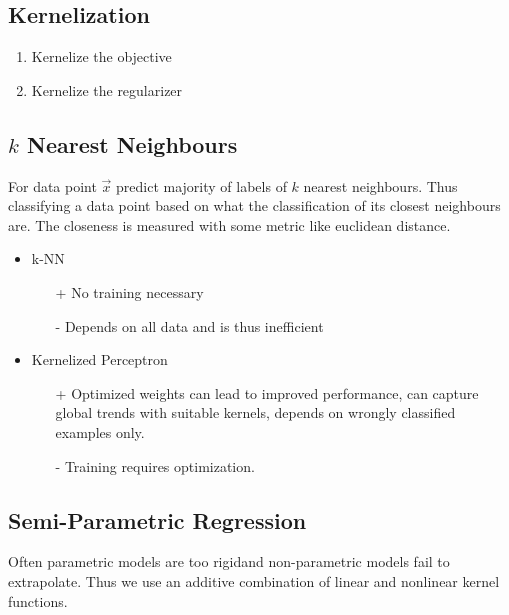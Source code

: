 \documentclass[8pt,a4paper]{scrartcl}
\begin{document}
\begin{multicols*}{3}
\subsection{Kernelization}


\begin{enumerate}
\ncompaq
\item Kernelize the objective
\item Kernelize the regularizer
\end{enumerate}

\subsection{$k$ Nearest Neighbours}

For data point $\vec{x}$ predict majority of labels of $k$ nearest neighbours. Thus classifying a data point based on what the classification of its closest neighbours are. The closeness is measured with some metric like euclidean distance.


\begin{itemize}
\ncompaq
\item k-NN
\begin{itemize}
\ncompaq
\item[+] No training necessary
\item[-] Depends on all data and is thus inefficient
\end{itemize}
\item Kernelized Perceptron
\begin{itemize}
\ncompaq
\item[+] Optimized weights can lead to improved performance, can capture global trends with suitable kernels, depends on wrongly classified examples only.
\item[-] Training requires optimization.
\end{itemize}
\end{itemize}

\subsection{Semi-Parametric Regression}

Often parametric models are too \glqq rigid\grqq and non-parametric models fail to extrapolate. Thus we use an additive combination of linear and nonlinear kernel functions.


\end{multicols*}
\end{document}
